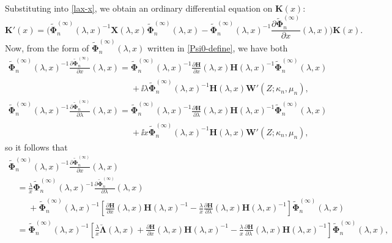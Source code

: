 Substituting into \eqref{lax-x}, we obtain an ordinary differential equation on $\mathbf{K}(x)$:
\begin{equation}
 \mathbf{K}'(x)=\bigg(\widetilde{\boldsymbol\Phi}_n^{(\infty)}(\lambda,x)^{-1}\mathbf{X}(\lambda,x)\widetilde{\boldsymbol\Phi}_n^{(\infty)}(\lambda,x)-
 \widetilde{\boldsymbol\Phi}_n^{(\infty)}(\lambda,x)^{-1}\frac{\partial\widetilde{\boldsymbol\Phi}_{n}^{(\infty)}}{\partial x}(\lambda,x)\bigg)\mathbf{K}(x).
 \label{K-ODE}
\end{equation}
Now, from the form of $\widetilde{\boldsymbol\Phi}_n^{(\infty)}(\lambda,x)$ written in \eqref{Psi0-define}, we have both
\begin{gather*}
 \widetilde{\boldsymbol{\Phi}}_n^{(\infty)}(\lambda,x)^{-1}\frac{\partial\widetilde{\boldsymbol\Phi}_{n}^{(\infty)}}{\partial x}(\lambda,x)=\widetilde{\boldsymbol{\Phi}}_n^{(\infty)}(\lambda,x)^{-1}\frac{\partial\mathbf{H}}{\partial x}(\lambda,x)\mathbf{H}(\lambda,x)^{-1}\widetilde{\boldsymbol\Phi}_n^{(\infty)}(\lambda,x) \\
\phantom{ \widetilde{\boldsymbol{\Phi}}_n^{(\infty)}(\lambda,x)^{-1}\frac{\partial\widetilde{\boldsymbol\Phi}_{n}^{(\infty)}}{\partial x}(\lambda,x)=}{}+ \ii\lambda\widetilde{\boldsymbol\Phi}_n^{(\infty)}(\lambda,x)^{-1}\mathbf{H}(\lambda,x)\mathbf{W}'(Z;\kappa_n,\mu_n),\\
 \widetilde{\boldsymbol{\Phi}}_n^{(\infty)}(\lambda,x)^{-1}\frac{\partial\widetilde{\boldsymbol\Phi}_{n}^{(\infty)}}{\partial\lambda}(\lambda,x)=\widetilde{\boldsymbol{\Phi}}_n^{(\infty)}(\lambda,x)^{-1}\frac{\partial\mathbf{H}}{\partial\lambda}(\lambda,x)\mathbf{H}(\lambda,x)^{-1}\widetilde{\boldsymbol\Phi}_n^{(\infty)}(\lambda,x) \\
\phantom{ \widetilde{\boldsymbol{\Phi}}_n^{(\infty)}(\lambda,x)^{-1}\frac{\partial\widetilde{\boldsymbol\Phi}_{n}^{(\infty)}}{\partial\lambda}(\lambda,x)=}{}+ \ii x\widetilde{\boldsymbol\Phi}_n^{(\infty)}(\lambda,x)^{-1}\mathbf{H}(\lambda,x)\mathbf{W}'(Z;\kappa_n,\mu_n),
\end{gather*}
so it follows that
\begin{gather*}
 \widetilde{\boldsymbol{\Phi}}_n^{(\infty)}(\lambda,x)^{-1}\frac{\partial\widetilde{\boldsymbol\Phi}_{n}^{(\infty)}}{\partial x}(\lambda,x)\\
\quad=\frac{\lambda}{x}\widetilde{\boldsymbol{\Phi}}_n^{(\infty)}(\lambda,x)^{-1}\frac{\partial\widetilde{\boldsymbol{\Phi}}_{n}^{(\infty)}}{\partial\lambda}(\lambda,x)\\
 \quad\phantom{=}{}+ \widetilde{\boldsymbol{\Phi}}_n^{(\infty)}(\lambda,x)^{-1}\left[\frac{\partial\mathbf{H}}{\partial x}(\lambda,x)\mathbf{H}(\lambda,x)^{-1}-\frac{\lambda}{x}\frac{\partial\mathbf{H}}{\partial\lambda}(\lambda,x)\mathbf{H}(\lambda,x)^{-1}\right]\widetilde{\boldsymbol{\Phi}}_n^{(\infty)}(\lambda,x)\\
 \quad=\widetilde{\boldsymbol{\Phi}}_n^{(\infty)}(\lambda,x)^{-1}\left[\frac{\lambda}{x}\breve{\boldsymbol\Lambda}(\lambda,x) + \frac{\partial\mathbf{H}}{\partial x}(\lambda,x)\mathbf{H}(\lambda,x)^{-1}-\frac{\lambda}{x}\frac{\partial\mathbf{H}}{\partial\lambda}(\lambda,x)\mathbf{H}(\lambda,x)^{-1}\right]\widetilde{\boldsymbol{\Phi}}_n^{(\infty)}(\lambda,x),
\end{gather*}
